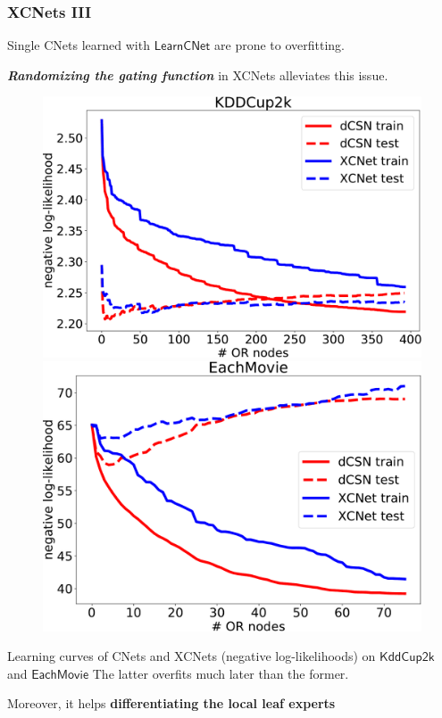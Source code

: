 \documentclass[xcolor={usenames,dvipsnames,svgnames}, compress]{beamer}
\begin{document}
\begin{frame}[t]
  \frametitle{XCNets III}
  \small
  Single CNets learned with $\mathsf{LearnCNet}$ are prone to
  overfitting.\par
  \textbf{\emph{Randomizing the gating function}} in \textsf{XCNets} alleviates this issue.
   \vspace{10pt} 
\begin{figure}[t]
  \label{fig:ll}
  \centering
    \includegraphics[width=0.42\linewidth]{figures/kdd-crop} \hspace{20pt}
    \includegraphics[width=0.41\linewidth]{figures/tmovie-crop}
\end{figure}
\hspace{30pt}
\begin{minipage}{0.8\linewidth}
  \vspace{-10pt}
\tiny  Learning curves of CNets and XCNets (negative
log-likelihoods) on $\mathsf{KddCup2k}$ and $\mathsf{EachMovie}$
The latter overfits much later than the former.
\end{minipage}\par
\vspace{10pt}
Moreover, it helps \textbf{differentiating the local leaf experts }
\end{frame}
\end{document}
